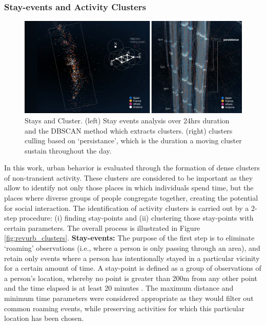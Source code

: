 \subsubsection{Stay-events and Activity Clusters}
{

    \begin{figure}[!h]
        \begin{center}
            \includegraphics[width=1\textwidth]{chapters/insight/revurb/figures/revurb_data.png}
        \end{center}
        \caption{Stays and Cluster. (left) Stay events analysis over 24hrs duration and the DBSCAN method which extracts clusters. (right) clusters culling based on `persistance', which is the duration a moving cluster sustain throughout the day.}
        \label{fig:revurb_data}
    \end{figure}

    In this work, urban behavior is evaluated through the formation of dense clusters of non-transient activity. These clusters are considered to be important as they allow to identify not only those places in which individuals spend time, but the places where diverse groups of people congregate together, creating the potential for social interaction. The identification of activity clusters is carried out by a 2-step procedure: (i) finding stay-points and (ii) clustering those stay-points with certain parameters. The overall process is illustrated in Figure \eqref{fig:revurb_clusters}.
    \newline
    \textbf{Stay-events:} The purpose of the first step is to eliminate `roaming' observations (i.e., where a person is only passing through an area), and retain only events where a person has intentionally stayed in a particular vicinity for a certain amount of time. A stay-point is defined as a group of observations of a person's location, whereby no point is greater than 200m from any other point and the time elapsed is at least 20 minutes \cite{li2008mining}. The maximum distance and minimum time parameters were considered appropriate as they would filter out common roaming events, while preserving activities for which this particular location has been chosen.

}
